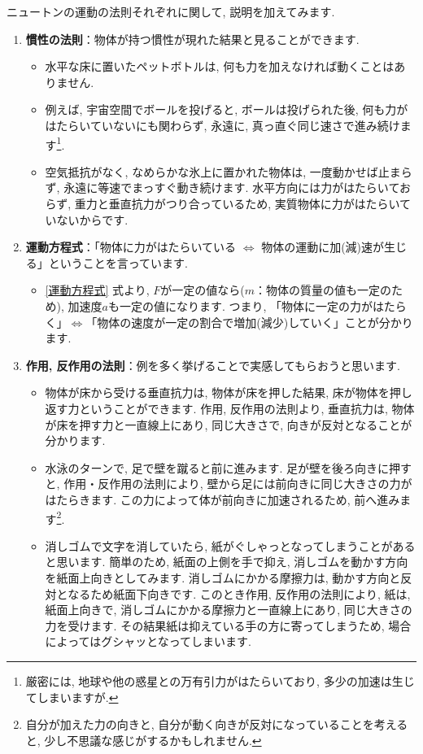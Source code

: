\documentclass[11pt,dvipdfmx]{jsarticle}
\numberwithin{equation}{section} %
\begin{document}
ニュートンの運動の法則それぞれに関して, 説明を加えてみます. 
    \begin{enumerate}
        \item \textbf{慣性の法則}：物体が持つ慣性が現れた結果と見ることができます. 
        \begin{itemize}
            \item 水平な床に置いたペットボトルは, 何も力を加えなければ動くことはありません. 
            \item 例えば, 宇宙空間でボールを投げると, ボールは投げられた後, 何も力がはたらいていないにも関わらず, 永遠に, 真っ直ぐ同じ速さで進み続けます\footnote{厳密には, 地球や他の惑星との万有引力がはたらいており, 多少の加速は生じてしまいますが.}. 
            \item 空気抵抗がなく, なめらかな氷上に置かれた物体は, 一度動かせば止まらず, 永遠に等速でまっすぐ動き続けます. 水平方向には力がはたらいておらず, 重力と垂直抗力がつり合っているため, 実質物体に力がはたらいていないからです.
        \end{itemize}
        \item \textbf{運動方程式}：「物体に力がはたらいている $\Longleftrightarrow$ 物体の運動に加(減)速が生じる」ということを言っています. 
        \begin{itemize}
            \item \eqref{運動方程式} 式より, $F$が一定の値なら($m$：物体の質量の値も一定のため), 加速度$a$も一定の値になります. つまり, 「物体に一定の力がはたらく」$\Longleftrightarrow$「物体の速度が一定の割合で増加(減少)していく」ことが分かります.
        \end{itemize}
        \item \textbf{作用, 反作用の法則}：例を多く挙げることで実感してもらおうと思います. 
        \begin{itemize}
            \item 物体が床から受ける垂直抗力は, 物体が床を押した結果, 床が物体を押し返す力ということができます. 作用, 反作用の法則より, 垂直抗力は, 物体が床を押す力と一直線上にあり, 同じ大きさで, 向きが反対となることが分かります. 
            \item 水泳のターンで, 足で壁を蹴ると前に進みます. 足が壁を後ろ向きに押すと, 作用・反作用の法則により, 壁から足には前向きに同じ大きさの力がはたらきます. この力によって体が前向きに加速されるため, 前へ進みます\footnote{自分が加えた力の向きと, 自分が動く向きが反対になっていることを考えると, 少し不思議な感じがするかもしれません. }.
            \item 消しゴムで文字を消していたら, 紙がぐしゃっとなってしまうことがあると思います. 簡単のため, 紙面の上側を手で抑え, 消しゴムを動かす方向を紙面上向きとしてみます. 消しゴムにかかる摩擦力は, 動かす方向と反対となるため紙面下向きです. このとき作用, 反作用の法則により, 紙は, 紙面上向きで, 消しゴムにかかる摩擦力と一直線上にあり, 同じ大きさの力を受けます. その結果紙は抑えている手の方に寄ってしまうため, 場合によってはグシャッとなってしまいます. 
        \end{itemize} 
    \end{enumerate}
\end{document}
